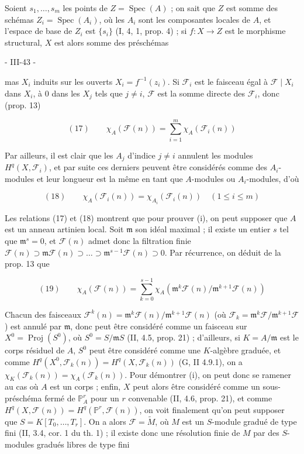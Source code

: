 Soient $s_1, \dots, s_m$ les points de $Z = \operatorname{Spec}(A)$ ; on sait que $Z$ est somme des schémas $Z_i = \operatorname{Spec}(A_i)$, où les $A_i$ sont les composantes locales de $A$, et l'espace de base de $Z_i$ est $\{s_i\}$ (I, 4, 1, prop. 4) ; si $f: X \to Z$ est le morphisme structural, $X$ est alors somme des préschémas

\newpage


\begin{flushright}
- III-43 -
\end{flushright}

mas $X_i$ induits sur les ouverts $X_i = f^{-1}(z_i)$. Si $\mathcal{F}_i$ est le faisceau égal à $\mathcal{F} \mid X_i$ dans $X_i$, à $0$ dans les $X_j$ tels que $j \neq i$, $\mathcal{F}$ est la somme directe des $\mathcal{F}_i$, donc (prop. 13)

$$(17) \qquad \chi_A(\mathcal{F}(n)) = \sum_{i=1}^m \chi_A(\mathcal{F}_i(n))$$

Par ailleurs, il est clair que les $A_j$ d'indice $j \neq i$ annulent les modules $H^q(X, \mathcal{F}_i)$, et par suite ces derniers peuvent être considérés comme des $A_i$-modules et leur longueur est la même en tant que $A$-modules ou $A_i$-modules, d'où

$$(18) \qquad \chi_A(\mathcal{F}_i(n)) = \chi_{A_i}(\mathcal{F}_i(n)) \quad (1 \le i \le m)$$

Les relations (17) et (18) montrent que pour prouver (i), on peut supposer que $A$ est un anneau artinien local. Soit $\mathfrak{m}$ son idéal maximal ; il existe un entier $s$ tel que $\mathfrak{m}^s = 0$, et $\mathcal{F}(n)$ admet donc la filtration finie $\mathcal{F}(n) \supset \mathfrak{m}\mathcal{F}(n) \supset \dots \supset \mathfrak{m}^{s-1}\mathcal{F}(n) \supset 0$. Par récurrence, on déduit de la prop. 13 que

$$(19) \qquad \chi_A(\mathcal{F}(n)) = \sum_{k=0}^{s-1} \chi_A(\mathfrak{m}^k\mathcal{F}(n)/\mathfrak{m}^{k+1}\mathcal{F}(n))$$

Chacun des faisceaux $\mathcal{F}^k(n) = \mathfrak{m}^k\mathcal{F}(n)/\mathfrak{m}^{k+1}\mathcal{F}(n)$ (où $\mathcal{F}_k = \mathfrak{m}^k\mathcal{F}/\mathfrak{m}^{k+1}\mathcal{F}$) est annulé par $\mathfrak{m}$, donc peut être considéré comme un faisceau sur $X^0 = \operatorname{Proj}(S^0)$, où $S^0 = S/\mathfrak{m}S$ (II, 4.5, prop. 21) ; d'ailleurs, si $K = A/\mathfrak{m}$ est le corps résiduel de $A$, $S^0$ peut être considéré comme une $K$-algèbre graduée, et comme $H^q(X^0, \mathcal{F}_k(n)) = H^q(X, \mathcal{F}_k(n))$ (G, II 4.9.1), on a $\chi_K(\mathcal{F}_k(n)) = \chi_A(\mathcal{F}_k(n))$. Pour démontrer (i), on peut donc se ramener au cas où $A$ est un corps ; enfin, $X$ peut alors être considéré comme un sous-préschéma fermé de $\mathbb{P}^r_A$ pour un $r$ convenable (II, 4.6, prop. 21), et comme $H^q(X, \mathcal{F}(n)) = H^q(\mathbb{P}^r, \mathcal{F}(n))$, on voit finalement qu'on peut supposer que $S = K[T_0, \dots, T_r]$. On a alors $\mathcal{F} = \tilde{M}$, où $M$ est un $S$-module gradué de type fini (II, 3.4, cor. 1 du th. 1) ; il existe donc une résolution finie de $M$ par des $S$-modules gradués libres de type fini

